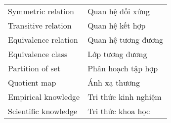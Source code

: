 \begin{center}
\begin{longtable}{ l  l }
            Symmetric relation & Quan hệ đối xứng \\ 
            Transitive relation & Quan hệ kết hợp  \\ 
            Equivalence relation & Quan hệ tương đương \\ 
            Equivalence class & Lớp tương đương \\ 
            Partition of set & Phân hoạch tập hợp \\ 
            Quotient map & Ánh xạ thương \\ 
            Empirical knowledge & Tri thức kinh nghiệm \\ 
            Scientific knowledge & Tri thức khoa học \\
\end{longtable}

\end{center}